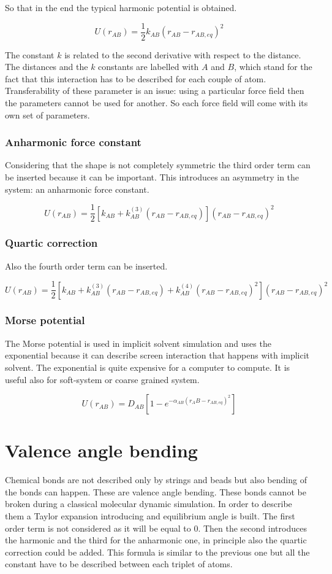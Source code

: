 	So that in the end the typical harmonic potential is obtained.

	$$U(r_{AB}) = \frac{1}{2}k_{AB}(r_{AB}-r_{AB,eq})^2$$

	The constant $k$ is related to the second derivative with respect to the distance.
	The distances and the $k$ constants are labelled with $A$ and $B$, which stand for the fact that this interaction has to be described for each couple of atom.
	Transferability of these parameter is an issue: using a particular force field then the parameters cannot be used for another.
	So each force field will come with its own set of parameters.

		\subsubsection{Anharmonic force constant}
		Considering that the shape is not completely symmetric the third order term can be inserted because it can be important.
		This introduces an asymmetry in the system: an anharmonic force constant.

		$$U(r_{AB}) = \frac{1}{2}[k_{AB}+k^{(3)}_{AB}(r_{AB}-r_{AB, eq})](r_{AB}-r_{AB, eq})^2$$

		\subsubsection{Quartic correction}
		Also the fourth order term can be inserted.

		$$U(r_{AB}) = \frac{1}{2}[k_{AB}+k^{(3)}_{AB}(r_{AB}-r_{AB, eq}) + k^{(4)}_{AB}(r_{AB}-r_{AB,eq})^2](r_{AB}-r_{AB, eq})^2$$

		\subsubsection{Morse potential}
		The Morse potential is used in implicit solvent simulation and uses the exponential because it can describe screen interaction that happens with implicit solvent.
		The exponential is quite expensive for a computer to compute.
		It is useful also for soft-system or coarse grained system.

		$$U(r_{AB}) = D_{AB}[1-e^{-\alpha_{AB}(r_AB-r_{AB,eq})^2}]$$

\section{Valence angle bending}
Chemical bonds are not described only by strings and beads but also bending of the bonds can happen.
These are valence angle bending.
These bonds cannot be broken during a classical molecular dynamic simulation.
In order to describe them a Taylor expansion introducing and equilibrium angle is built.
The first order term is not considered as it will be equal to $0$.
Then the second introduces the harmonic and the third for the anharmonic one, in principle also the quartic correction could be added.
This formula is similar to the previous one but all the constant have to be described between each triplet of atoms.

